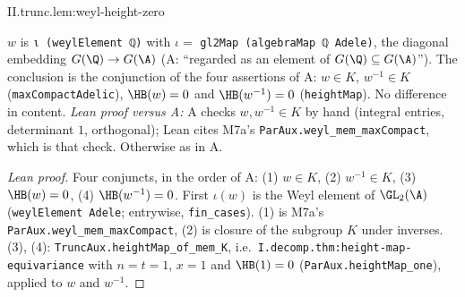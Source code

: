 \begin{lemma}
\end{lemma}
\begin{tfformal}{II.trunc.lem:weyl-height-zero}
\begin{tffidelity}
$w$ is \texttt{ι (weylElement ℚ)} with $\iota=$ \texttt{gl2Map (algebraMap ℚ Adele)}, the diagonal embedding $G(\Q)\to G(\A)$ (A: ``regarded as an element of $G(\Q)\subseteq G(\A)$''). The conclusion is the conjunction of the four assertions of A: $w\in K$, $w^{-1}\in K$ (\texttt{maxCompactAdelic}), $\HB(w)=0$ and $\HB(w^{-1})=0$ (\texttt{heightMap}). No difference in content. \emph{Lean proof versus A:} A checks $w,w^{-1}\in K$ by hand (integral entries, determinant $1$, orthogonal); Lean cites M7a's \texttt{ParAux.weyl\_mem\_maxCompact}, which is that check. Otherwise as in A.
\end{tffidelity}
\end{tfformal}
\begin{proof}[Lean proof]
Four conjuncts, in the order of A: (1) $w\in K$, (2) $w^{-1}\in K$, (3) $\HB(w)=0$, (4) $\HB(w^{-1})=0$. First $\iota(w)$ is the Weyl element of $\GL_2(\A)$ (\texttt{weylElement Adele}; entrywise, \texttt{fin\_cases}). (1) is M7a's \texttt{ParAux.weyl\_mem\_maxCompact}, (2) is closure of the subgroup $K$ under inverses. (3), (4): \texttt{TruncAux.heightMap\_of\_mem\_K}, i.e.\ \texttt{I.decomp.thm:height-map-equivariance} with $n=t=1$, $x=1$ and $\HB(1)=0$ (\texttt{ParAux.heightMap\_one}), applied to $w$ and $w^{-1}$.
\end{proof}

